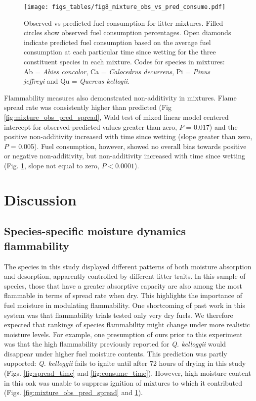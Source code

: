 \documentclass[letterpaper,12pt]{article}
\begin{document}
\begin{figure}[h]
  \centering
\texttt{[image: figs\_tables/fig8\_mixture\_obs\_vs\_pred\_consume.pdf]}
\caption{Observed vs predicted fuel consumption for litter mixtures. Filled
  circles show observed fuel consumption percentages. Open diamonds indicate
  predicted fuel consumption based on the average fuel consumption at each
  particular time since wetting for the three constituent species in each
  mixture. Codes for species in mixtures: Ab = \emph{Abies concolor}, Ca =
  \emph{Calocedrus decurrens}, Pi = \emph{Pinus jeffreyi} and Qu =
  \emph{Quercus kellogii}.}
  \label{fig:mixture_obs_pred_consume}
\end{figure}


Flammability measures also demonstrated non-additivity in mixtures. Flame
spread rate was consistently higher than predicted (Fig
\ref{fig:mixture_obs_pred_spread}, Wald test of mixed linear model centered
intercept for observed-predicted values greater than zero, $P$ = 0.017) and the
positive non-additivity increased with time since wetting (slope greater than
zero, $P$ = 0.005). Fuel consumption, however, showed no overall bias towards
positive or negative non-additivity, but non-additivity increased with time
since wetting (Fig. \ref{fig:mixture_obs_pred_consume}, slope not equal to
zero, $P < 0.0001$).

\section*{Discussion}

\subsection*{Species-specific moisture dynamics flammability}

The species in this study displayed different patterns of both moisture
absorption and desorption, apparently controlled by different litter traits. In
this sample of species, those that have a greater absorptive capacity are also
among the most flammable in terms of spread rate when dry. This highlights the
importance of fuel moisture in modulating flammability. One shortcoming of past
work in this system \citep{Magalhaes+Schwilk-2012} was that flammability trials
tested only very dry fuels. We therefore expected that rankings of species
flammability might change under more realistic moisture levels. For example,
one presumption of ours prior to this experiment was that the high flammability
previously reported for \emph{Q. kelloggii} \citep{Magalhaes+Schwilk-2012} would
disappear under higher fuel moisture contents. This prediction was partly
supported: \emph{Q. kelloggii} fails to ignite until after 72 hours of drying
in this study (Figs. \ref{fig:spread_time} and \ref{fig:consume_time}).
However, high moisture content in this oak was unable to suppress ignition of
mixtures to which it contributed (Figs. \ref{fig:mixture_obs_pred_spread} and
\ref{fig:mixture_obs_pred_consume}).
\end{document}
